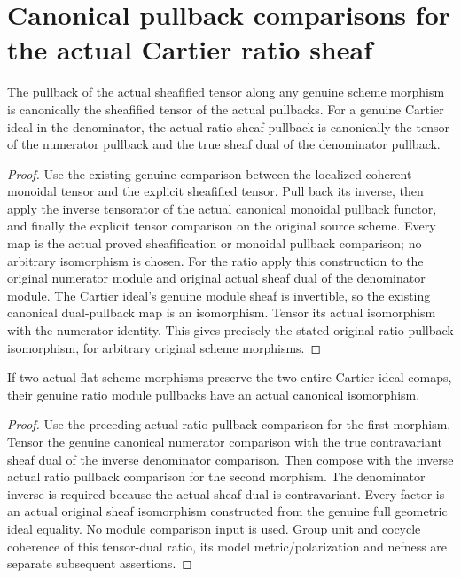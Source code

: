\section{Canonical pullback comparisons for the actual Cartier ratio sheaf}
\begin{lemma}
\label{lem:cartier-ratio-canonical-pullback}
\leanok
The pullback of the actual sheafified tensor along any genuine scheme
morphism is canonically the sheafified tensor of the actual pullbacks.
For a genuine Cartier ideal in the denominator, the actual ratio sheaf
pullback is canonically the tensor of the numerator pullback and the
true sheaf dual of the denominator pullback.
\end{lemma}
\begin{proof}
Use the existing genuine comparison between the localized coherent
monoidal tensor and the explicit sheafified tensor. Pull back its inverse,
then apply the inverse tensorator of the actual canonical monoidal
pullback functor, and finally the explicit tensor comparison on the
original source scheme. Every map is the actual proved sheafification
or monoidal pullback comparison; no arbitrary isomorphism is chosen.
For the ratio apply this construction to the original numerator module
and original actual sheaf dual of the denominator module. The Cartier
ideal's genuine module sheaf is invertible, so the existing canonical
dual-pullback map is an isomorphism. Tensor its actual isomorphism with
the numerator identity. This gives precisely the stated original ratio
pullback isomorphism, for arbitrary original scheme morphisms.
\end{proof}

\begin{lemma}
\label{lem:cartier-ratio-whole-invariant-comparison}
\leanok
If two actual flat scheme morphisms preserve the two entire Cartier
ideal comaps, their genuine ratio module pullbacks have an actual
canonical isomorphism.
\end{lemma}
\begin{proof}
Use the preceding actual ratio pullback comparison for the first
morphism. Tensor the genuine canonical numerator comparison with the
true contravariant sheaf dual of the inverse denominator comparison.
Then compose with the inverse actual ratio pullback comparison for the
second morphism. The denominator inverse is required because the actual
sheaf dual is contravariant. Every factor is an actual original sheaf
isomorphism constructed from the genuine full geometric ideal equality.
No module comparison input is used. Group unit and cocycle coherence of
this tensor-dual ratio, its model metric/polarization and nefness are
separate subsequent assertions.
\end{proof}


